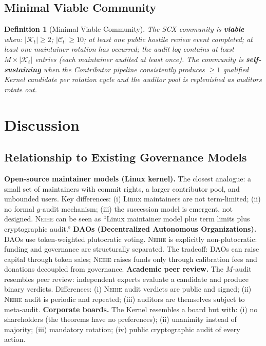 \documentclass[12pt,a4paper]{article}
\newtheorem{definition}[theorem]{Definition}
\theoremstyle{definition}
\newcommand{\Neihe}{\textsc{Neihe}}
\newcommand{\Kernel}{\mathcal{K}}
\newcommand{\Contributors}{\mathcal{C}}
\begin{document}
\subsection{Minimal Viable Community}
\begin{definition}[Minimal Viable Community]
\label{def:mvc}
The SCX community is \textbf{viable} when: $|\Kernel_t| \geq 2$; $|\Contributors_t| \geq 10$; at least one public hostile review event completed; at least one maintainer rotation has occurred; the audit log contains at least $M \times |\Kernel_t|$ entries (each maintainer audited at least once). The community is \textbf{self-sustaining} when the Contributor pipeline consistently produces $\geq 1$ qualified Kernel candidate per rotation cycle and the auditor pool is replenished as auditors rotate out.
\end{definition}
\section{Discussion}
\label{sec:discussion}
\subsection{Relationship to Existing Governance Models}
\textbf{Open-source maintainer models (Linux kernel).} The closest analogue: a small set of maintainers with commit rights, a larger contributor pool, and unbounded users. Key differences: (i) Linux maintainers are not term-limited; (ii) no formal $g$-audit mechanism; (iii) the succession model is emergent, not designed. \Neihe{} can be seen as ``Linux maintainer model plus term limits plus cryptographic audit.''
\textbf{DAOs (Decentralized Autonomous Organizations).} DAOs use token-weighted plutocratic voting. \Neihe{} is explicitly non-plutocratic: funding and governance are structurally separated. The tradeoff: DAOs can raise capital through token sales; \Neihe{} raises funds only through calibration fees and donations decoupled from governance.
\textbf{Academic peer review.} The $M$-audit resembles peer review: independent experts evaluate a candidate and produce binary verdicts. Differences: (i) \Neihe{} audit verdicts are public and signed; (ii) \Neihe{} audit is periodic and repeated; (iii) auditors are themselves subject to meta-audit.
\textbf{Corporate boards.} The Kernel resembles a board but with: (i) no shareholders (the theorems have no preferences); (ii) unanimity instead of majority; (iii) mandatory rotation; (iv) public cryptographic audit of every action.
\end{document}
